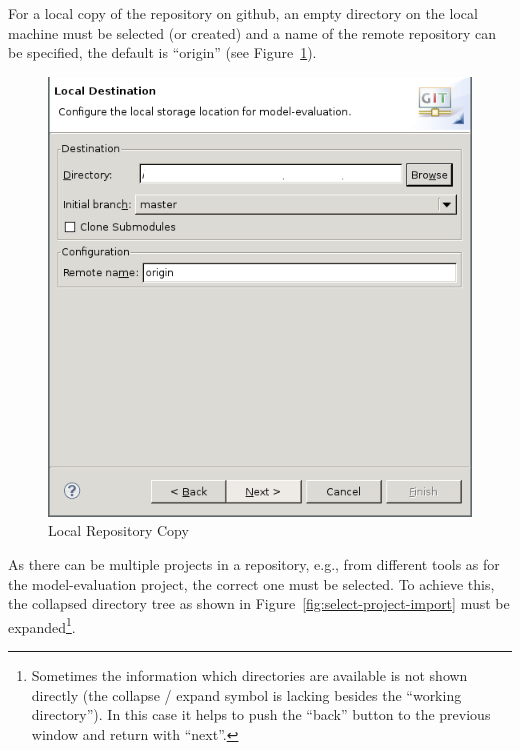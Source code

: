 \documentclass{template/openetcs_article}
\begin{document}
For a local copy of the repository on github, an empty directory on the local
machine must be selected (or created) and a name of the remote repository can be
specified, the default is ``origin'' (see Figure~\ref{fig:local-copy}).

\begin{figure}[H]
  \centering
  \includegraphics[width=\skalierung\textwidth]{project_import_step5}
  \caption{Local Repository Copy}
  \label{fig:local-copy}
\end{figure}

As there can be multiple projects in a repository, e.g., from different tools as
for the model-evaluation project, the correct one must be selected. To achieve
this, the collapsed directory tree as shown in
Figure~\ref{fig:select-project-import} must be expanded\footnote{Sometimes the
  information which directories are available is not shown directly (the
  collapse / expand symbol is lacking besides the ``working directory''). In
  this case it helps to push the ``back'' button to the previous window and
  return with ``next''.}.
\end{document}
